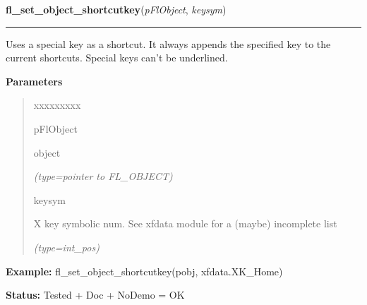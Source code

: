 \hspace{.8\funcindent}\begin{boxedminipage}{\funcwidth}

    \raggedright \textbf{fl\_set\_object\_shortcutkey}(\textit{pFlObject}, \textit{keysym})

    \vspace{-1.5ex}

    \rule{\textwidth}{0.5\fboxrule}
\setlength{\parskip}{2ex}
    Uses a special key as a shortcut. It always appends the specified key 
    to the current shortcuts. Special keys can't be underlined.

\setlength{\parskip}{1ex}
      \textbf{Parameters}
      \vspace{-1ex}

      \begin{quote}
        \begin{Ventry}{xxxxxxxxx}

          \item[pFlObject]

          object

            {\it (type=pointer to FL\_OBJECT)}

          \item[keysym]

          X key symbolic num. See xfdata module for a (maybe) incomplete 
          list

            {\it (type=int\_pos)}

        \end{Ventry}

      \end{quote}

\textbf{Example:} fl\_set\_object\_shortcutkey(pobj, xfdata.XK\_Home)



\textbf{Status:} Tested + Doc + NoDemo = OK



    \end{boxedminipage}

    \label{xformslib:flbasic:fl_set_object_dblbuffer}

    \vspace{0.5ex}

